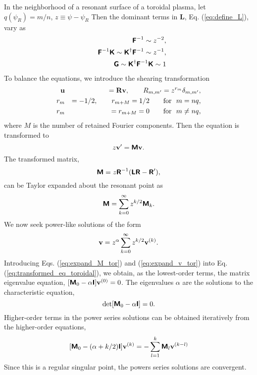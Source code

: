 \documentclass[prb,twocolumn,showpacs,preprintnumbers,amsmath,amssymb]{revtex4}
\renewcommand*{\v}[1]{\hbox{\bfseries #1}}
\renewcommand*{\t}[1]{\hbox{\sffamily\bfseries #1}}
\begin{document}
In the neighborhood of a resonant surface of a toroidal plasma, let
$q(\psi_R) = m/n$, $z \equiv \psi - \psi_R $ Then the dominant terms in
\t{L}, Eq. (\ref{eq:define_L}), vary as
\begin{eqnarray}
&&\t{F}^{-1} \sim z^{-2}, \nonumber \\
&&\t{F}^{-1} \t{K} \sim \t{K}^\dagger \t{F}^{-1} \sim z^{-1}, \nonumber \\
&&\t{G} \sim \t{K}^\dagger \t{F}^{-1} \t{K} \sim 1
\end{eqnarray}
To balance the equations, we introduce the shearing transformation
\begin{eqnarray}
\v{u} &&= \v{R} \v{v}, \qquad R_{m,m'} = z^{r_m} \delta_{m,m'},
	\nonumber \\
r_m &&= -1/2, \qquad r_{m+M} = 1/2 \qquad {\rm for\ } \ m = n q,
	\nonumber \\
r_m &&= r_{m+M} = 0 \qquad {\rm for\ } \ m \ne n q,
\label{eq:shear_tor}
\end{eqnarray}
where $M$ is the number of retained Fourier components.  Then the
equation is transformed to
\begin{equation}
z \v{v}' = \t{M} \v{v}.
\label{eq:transformed_eq_toroidal}
\end{equation}
The transformed matrix,
\[
\t{M} = z \t{R}^{-1} (\t{L} \t{R} - \t{R}' ),
\]
can be Taylor expanded about the resonant point as
\begin{equation}
\t{M} = \sum_{k=0}^\infty z^{k/2} \t{M}_k.
\label{eq:expand_M_tor}
\end{equation}
We now seek power-like solutions of the form 
\begin{equation}
\v{v} = z^\alpha \sum_{k=0}^\infty z^{k/2} \v{v}^{(k)}.
\label{eq:expand_v_tor}
\end{equation}
Introducing Eqs. (\ref{eq:expand_M_tor}) and (\ref{eq:expand_v_tor})
into Eq. (\ref{eq:transformed_eq_toroidal}), we obtain, as the
lowest-order terms, the matrix eigenvalue equation, $[\t{M}_0 - \alpha
\t{I}] \v{v}^{(0)} = 0$.  The eigenvalues $\alpha$ are the solutions to
the characteristic equation,
\begin{equation}
\det [\t{M}_0 - \alpha \t{I}] = 0.
\label{eq:det_M}
\end{equation}
Higher-order terms in the power series solutions can be obtained
iteratively from the higher-order equations,
\[
[\t{M}_0 - (\alpha + k/2) \t{I}] \v{v}^{(k)} 
	= - \sum_{l=1}^k \t{M}_l \v{v}^{(k-l)}
\]
Since this is a regular singular point, the powers series solutions are
convergent.
\end{document}
